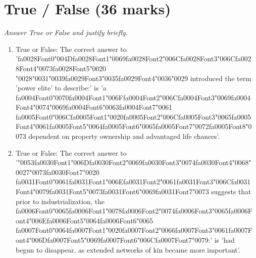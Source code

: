 \documentclass[12pt]{article}
\begin{document}
\section*{True / False (36 marks)}
\textit{Answer True or False and justify briefly.}
\begin{enumerate}[label=\arabic*.]
\item True or False: The correct answer to '{\csname fa0028Font0\endcsname\char"004D}{\csname fa0028Font1\endcsname\char"0069}{\csname fa0028Font2\endcsname\char"006C}{\csname fa0028Font3\endcsname\char"006C}{\csname fa0028Font4\endcsname\char"0073}{\csname fa0028Font5\endcsname\char"0020} {\char"0028}{\char"0031}{\char"0039}{\csname fa0029Font3\endcsname\char"0035}{\csname fa0029Font4\endcsname\char"0036}{\char"0029} introduced the term 'power elite' to describe:' is 'a {\csname fa0004Font0\endcsname\char"0070}{\csname fa0004Font1\endcsname\char"006F}{\csname fa0004Font2\endcsname\char"006C}{\csname fa0004Font3\endcsname\char"0069}{\csname fa0004Font4\endcsname\char"0074}{\char"0069}{\csname fa0004Font6\endcsname\char"0063}{\csname fa0004Font7\endcsname\char"0061} {\csname fa0005Font0\endcsname\char"006C}{\csname fa0005Font1\endcsname\char"0020}{\csname fa0005Font2\endcsname\char"006C}{\csname fa0005Font3\endcsname\char"0065}{\csname fa0005Font4\endcsname\char"0061}{\csname fa0005Font5\endcsname\char"0064}{\csname fa0005Font6\endcsname\char"0065}{\csname fa0005Font7\endcsname\char"0072}{\csname fa0005Font8\endcsname\char"0073} dependent on property ownership and advantaged life chances'.
\item True or False: The correct answer to '{\char"0053}{\csname fa0030Font1\endcsname\char"006D}{\csname fa0030Font2\endcsname\char"0069}{\csname fa0030Font3\endcsname\char"0074}{\csname fa0030Font4\endcsname\char"0068}{\char"0027}{\char"0073}{\csname fa0030Font7\endcsname\char"0020} {\csname fa0031Font0\endcsname\char"0061}{\csname fa0031Font1\endcsname\char"006E}{\csname fa0031Font2\endcsname\char"0061}{\csname fa0031Font3\endcsname\char"006C}{\csname fa0031Font4\endcsname\char"0079}{\csname fa0031Font5\endcsname\char"0073}{\csname fa0031Font6\endcsname\char"0069}{\csname fa0031Font7\endcsname\char"0073} suggests that prior to industrialization, the {\csname fa0006Font0\endcsname\char"0065}{\csname fa0006Font1\endcsname\char"0078}{\csname fa0006Font2\endcsname\char"0074}{\csname fa0006Font3\endcsname\char"0065}{\csname fa0006Font4\endcsname\char"006E}{\csname fa0006Font5\endcsname\char"0064}{\csname fa0006Font6\endcsname\char"0065} {\csname fa0007Font0\endcsname\char"0064}{\csname fa0007Font1\endcsname\char"0020}{\csname fa0007Font2\endcsname\char"0066}{\csname fa0007Font3\endcsname\char"0061}{\csname fa0007Font4\endcsname\char"006D}{\csname fa0007Font5\endcsname\char"0069}{\csname fa0007Font6\endcsname\char"006C}{\csname fa0007Font7\endcsname\char"0079}:' is 'had begun to disappear, as extended networks of kin became more important'.

\end{enumerate}
\end{document}
